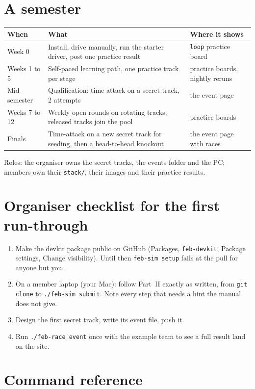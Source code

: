 \documentclass[11pt,a4paper]{article}
\newcommand{\file}[1]{\texttt{#1}}
\newcommand{\cmd}[1]{\texttt{#1}}
\begin{document}
\section{A semester}

\begin{tabularx}{\linewidth}{lXl}
\toprule
When & What & Where it shows\\
\midrule
Week 0 & Install, drive manually, run the starter driver, post one practice result & \texttt{loop} practice board\\
Weeks 1 to 5 & Self-paced learning path, one practice track per stage & practice boards, nightly reruns\\
Mid-semester & Qualification: time-attack on a secret track, 2 attempts & the event page\\
Weeks 7 to 12 & Weekly open rounds on rotating tracks; released tracks join the pool & practice boards\\
Finals & Time-attack on a new secret track for seeding, then a head-to-head knockout & the event page with races\\
\bottomrule
\end{tabularx}

\medskip
Roles: the organiser owns the secret tracks, the events folder and the PC; members own their
\file{stack/}, their images and their practice results.

\section{Organiser checklist for the first run-through}

\begin{enumerate}
  \item Make the devkit package public on GitHub (Packages, \texttt{feb-devkit}, Package settings, Change visibility). Until then \cmd{feb-sim setup} fails at the pull for anyone but you.
  \item On a member laptop (your Mac): follow Part~II exactly as written, from \cmd{git clone} to \cmd{./feb-sim submit}. Note every step that needs a hint the manual does not give.
  \item Design the first secret track, write its event file, push it.
  \item Run \cmd{./feb-race event} once with the example team to see a full result land on the site.
\end{enumerate}

\appendix
\section{Command reference}
\end{document}
